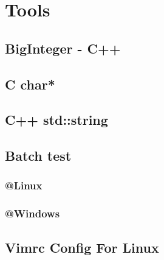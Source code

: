 \section{Tools}
	\subsection{BigInteger - C++}
		
	\subsection{C char*}
		
	\subsection{C++ std::string}
		
	\subsection{Batch test}
		\subsubsection{@Linux}
			
		\subsubsection{@Windows}
			
	\subsection{Vimrc Config For Linux}
		
